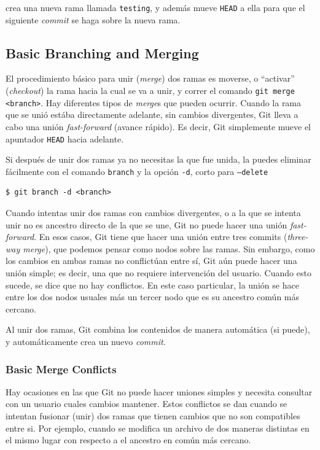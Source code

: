 \documentclass[spanish, 12pt, a4paper]{article}
\begin{document}
crea una nueva rama llamada \passthrough{\lstinline!testing!}, y además
mueve \passthrough{\lstinline!HEAD!} a ella para que el siguiente
\emph{commit} se haga sobre la nueva rama.

\subsection{Basic Branching and Merging}

El procedimiento básico para unir (\emph{merge}) dos ramas es moverse, o
``activar'' (\emph{checkout}) la rama hacia la cual se va a unir, y
correr el comando \passthrough{\lstinline!git merge <branch>!}. Hay
diferentes tipos de \emph{merge}s que pueden ocurrir. Cuando la rama que
se unió estába directamente adelante, sin cambios divergentes, Git lleva
a cabo una unión \emph{fast-forward} (avance rápido). Es decir, Git
simplemente mueve el apuntador \passthrough{\lstinline!HEAD!} hacia
adelante.

Si después de unir dos ramas ya no necesitas la que fue unida, la puedes
eliminar fácilmente con el comando \passthrough{\lstinline!branch!} y la
opción \passthrough{\lstinline!-d!}, corto para
\passthrough{\lstinline!–delete!}

\begin{lstlisting}
$ git branch -d <branch>
\end{lstlisting}

Cuando intentas unir dos ramas con cambios divergentes, o a la que se
intenta unir no es ancestro directo de la que se une, Git no puede hacer
una unión \emph{fast-forward}. En esos casos, Git tiene que hacer una
unión entre tres commits (\emph{three-way merge}), que podemos pensar
como nodos sobre las ramas. Sin embargo, como los cambios en ambas ramas
no conflictúan entre sí, Git aún puede hacer una unión simple; es decir,
una que no requiere intervención del usuario. Cuando esto sucede, se
dice que no hay conflictos. En este caso particular, la unión se hace
entre los dos nodos usuales más un tercer nodo que es su ancestro común
más cercano.

Al unir dos ramas, Git combina los contenidos de manera automática (si
puede), y automáticamente crea un nuevo \emph{commit}.

\subsubsection{Basic Merge Conflicts}

Hay ocasiones en las que Git no puede hacer uniones simples y necesita
consultar con un usuario cuales cambios mantener. Estos conflictos se
dan cuando se intentan fusionar (unir) dos ramas que tienen cambios que
no son compatibles entre si. Por ejemplo, cuando se modifica un archivo
de dos maneras distintas en el mismo lugar con respecto a el ancestro en
común más cercano.
\end{document}
